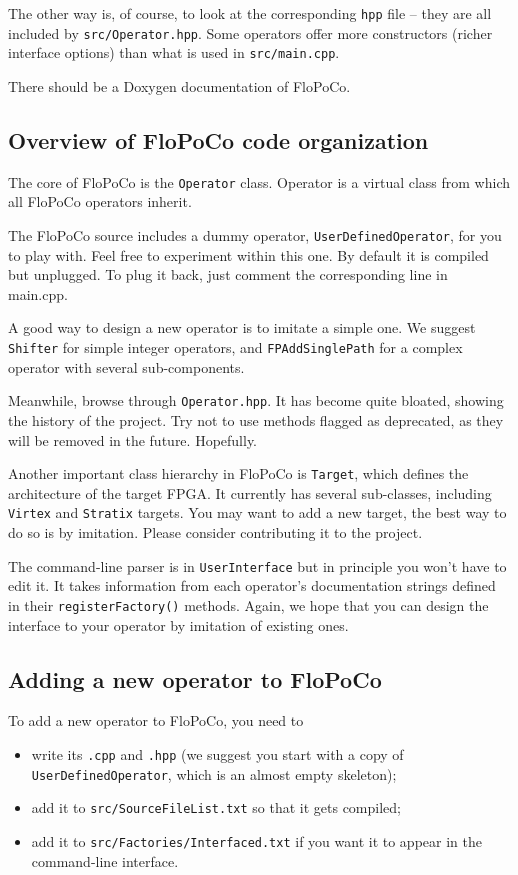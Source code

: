 \documentclass{article}
\begin{document}
The other way is, of course, to look at the corresponding \texttt{hpp}
file -- they are all included by \texttt{src/Operator.hpp}. Some
operators offer more constructors (richer interface options) than what
is used in \texttt{src/main.cpp}.


There should be a Doxygen documentation of FloPoCo.

\subsection{Overview of FloPoCo code organization}

The core of FloPoCo is the \texttt{Operator} class. 
Operator is a virtual class from which all FloPoCo operators inherit. 

The FloPoCo source includes a dummy operator, \texttt{UserDefinedOperator}, for you to play with. 
Feel free to experiment within this one. 
By default it is compiled but unplugged. To plug it back, just comment the corresponding line in main.cpp.

A good way to design a new operator is to imitate a simple one. We suggest
\texttt{Shifter} for simple integer operators, and \texttt{FPAddSinglePath}
for a complex operator with several sub-components.

Meanwhile, browse through \texttt{Operator.hpp}. It has become quite bloated, showing
the history of the project. Try not to use methods flagged as
deprecated, as they will be removed in the future. Hopefully.%

Another important class hierarchy in FloPoCo is \texttt{Target}, which
defines the architecture of the target FPGA. It currently has several sub-classes,
including \texttt{Virtex} and \texttt{Stratix} targets. You may want to
add a new target, the best way to do so is by imitation. Please
consider contributing it to the project.

The command-line parser is in \texttt{UserInterface} but in principle you won't have to edit it.
It takes information from each operator's documentation strings defined in their \texttt{registerFactory()} methods. 
Again, we hope that you can design the interface to your operator by imitation of existing ones.

\subsection{Adding a new operator to FloPoCo}
To add a new operator to FloPoCo, you need to 
\begin{itemize}
\item write its \texttt{.cpp} and \texttt{.hpp} (we suggest you start with a copy of  \texttt{UserDefinedOperator}, which is an almost empty skeleton);
\item add it to \texttt{src/SourceFileList.txt} so that it gets compiled;
\item add it to \texttt{src/Factories/Interfaced.txt} if you want it to appear in the command-line interface.
\end{itemize}
\end{document}
